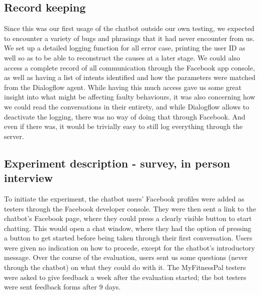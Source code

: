 \subsection{Record keeping}
Since this was our first usage of the chatbot outside our own testing, we expected to encounter a variety of bugs and phrasings that it had never encounter from us. We set up a detailed logging function for all error case, printing the user ID as well so as to be able to reconstruct the causes at a later stage. We could also access a complete record of all communication through the Facebook app console, as well as having a list of intents identified and how the parameters were matched from the Dialogflow agent. While having this much access gave us some great insight into what might be affecting faulty behaviours, it was also concerning how we could read the conversations in their entirety, and while Dialogflow allows to deactivate the logging, there was no way of doing that through Facebook. And even if there was, it would be trivially easy to still log everything through the server.


\subsection{Experiment description - survey, in person interview}
To initiate the experiment, the chatbot users' Facebook profiles were added as testers through the Facebook developer console. They were then sent a link to the chatbot's Facebook page, where they could press a clearly visible button to start chatting. This would open a chat window, where they had the option of pressing a button to get started before being taken through their first conversation. Users were given no indication on how to procede, except for the chatbot's introductory message. Over the course of the evaluation, users sent us some questions (never through the chatbot) on what they could do with it.
The MyFitnessPal testers were asked to give feedback a week after the evaluation started; the bot testers were sent feedback forms after 9 days.


